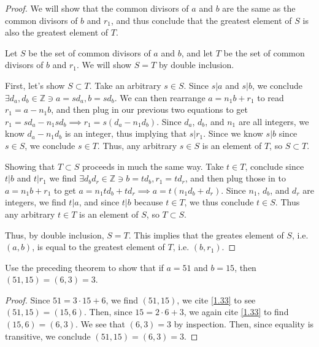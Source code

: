 \documentclass[../main.tex]{subfiles}
\begin{document}
\begin{proof}
  We will show that the common divisors of $a$ and $b$ are the same as the common divisors of $b$ and $r_1$, and thus conclude that the greatest element of $S$ is also the greatest element of $T$.

  Let $S$ be the set of common divisors of $a$ and $b$, and let $T$ be the set of common divisors of $b$ and $r_1$. We will show $S = T$ by double inclusion.

  First, let's show $S \subset T$. Take an arbitrary $s \in S$. Since $s|a$ and $s|b$, we conclude $\exists d_a, d_b \in \mathbb{Z} \ni a = sd_a, b=sd_b$. We can then rearrange $a = n_1b + r_1$ to read $r_1 = a - n_1b$, and then plug in our previous two equations to get $r_1 = sd_a - n_1 sd_b \implies r_1 = s(d_a - n_1 d_b)$.
  Since $d_a$, $d_b$, and $n_1$ are all integers, we know $d_a - n_1 d_b$ is an integer, thus implying that $s | r_1$. Since we know $s|b$ since $s \in S$, we conclude $s \in T$. Thus, any arbitrary $s \in S$ is an element of $T$, so $S \subset T$.

  Showing that $T \subset S$ proceeds in much the same way. Take $t \in T$, conclude since $t|b$ and $t|r_1$ we find $\exists d_b d_r \in \mathbb{Z} \ni b = td_b, r_1 = td_r$, and then plug those in to $a = n_1b + r_1$ to get $a = n_1 td_b + td_r \implies a = t(n_1 d_b + d_r)$. Since $n_1$, $d_b$, and $d_r$ are integers, we find $t | a$, and since $t | b$ because $t \in T$, we thus conclude $t \in S$.
  Thus any arbitrary $t \in T$ is an element of $S$, so $T \subset S$.

  Thus, by double inclusion, $S = T$. This implies that the greates element of $S$, i.e. $(a, b)$, is equal to the greatest element of $T$, i.e. $(b, r_1)$.
\end{proof}



\begin{ex} \label{1.34}
  Use the preceding theorem to show that if $a = 51$ and $b = 15$, then $(51, 15) = (6, 3) = 3$.
\end{ex}

\begin{proof}
  Since $51 = 3 \cdot 15 + 6$, we find $(51, 15)$, we cite \ref{1.33} to see $(51, 15) = (15, 6)$. Then, since $15 = 2 \cdot 6 + 3$, we again cite \ref{1.33} to find $(15, 6) = (6, 3)$. We see that $(6, 3) = 3$ by inspection. Then, since equality is transitive, we conclude $(51, 15) = (6, 3) = 3$.
\end{proof}
\end{document}

